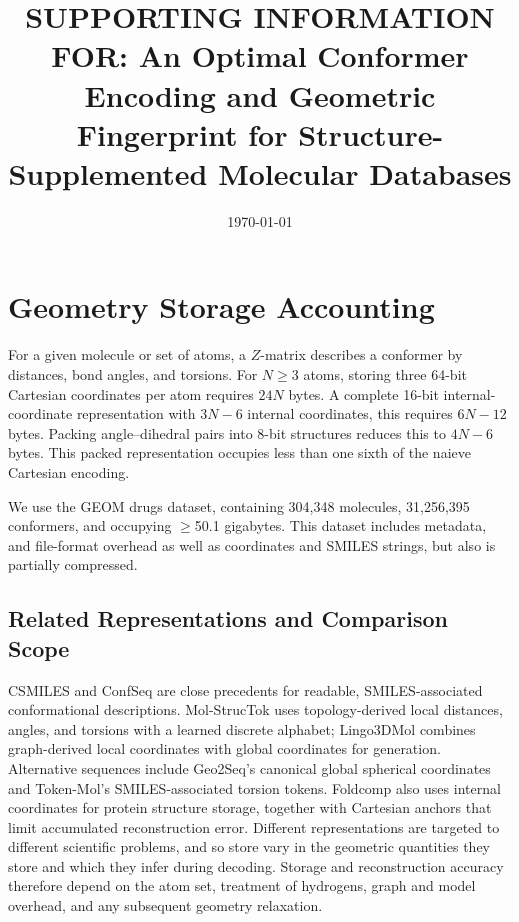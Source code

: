 \documentclass[%
 preprint,
superscriptaddress,
 amsmath,amssymb,
 aip,
 jcp,
]{revtex4-2}
\begin{document}
\title{
SUPPORTING INFORMATION FOR: An Optimal Conformer Encoding and Geometric Fingerprint for Structure-Supplemented Molecular Databases
}
\date{\today}

\maketitle


\section{Geometry Storage Accounting}
\label{sec:geometry_storage}

For a given molecule or set of atoms, a $Z$-matrix describes a conformer by distances, bond angles, and torsions.
For $N\geq3$ atoms, storing three 64-bit Cartesian coordinates per atom requires $24N$ bytes.
A complete 16-bit internal-coordinate representation with $3N-6$ internal coordinates, this requires $6N-12$ bytes. 
Packing angle--dihedral pairs into 8-bit structures reduces this to $4N-6$ bytes.
This packed representation occupies less than one sixth of the naieve Cartesian encoding.

We use the GEOM drugs dataset, containing 304,348 molecules, 31,256,395 conformers, and occupying $\ge$50.1 gigabytes.\cite{GEOM}
This dataset includes metadata, and file-format overhead as well as coordinates and SMILES strings, but also is partially compressed.

\subsection{Related Representations and Comparison Scope}

CSMILES and ConfSeq are close precedents for readable, SMILES-associated conformational descriptions.\cite{Furness2025CSMILES,Xiong2026ConfSeq}
Mol-StrucTok uses topology-derived local distances, angles, and torsions with a learned discrete alphabet; Lingo3DMol combines graph-derived local coordinates with global coordinates for generation.\cite{Gao2024MolStrucTok,Feng2024Lingo3DMol}
Alternative sequences include Geo2Seq's canonical global spherical coordinates and Token-Mol's SMILES-associated torsion tokens.\cite{Li2025Geo2Seq,Wang2025TokenMol}
Foldcomp also uses internal coordinates for protein structure storage, together with Cartesian anchors that limit accumulated reconstruction error.\cite{Kim2023:Foldcomp}
Different representations are targeted to different scientific problems, and so store vary in the geometric quantities they store and which they infer during decoding.
Storage and reconstruction accuracy therefore depend on the atom set, treatment of hydrogens, graph and model overhead, and any subsequent geometry relaxation.
\end{document}
